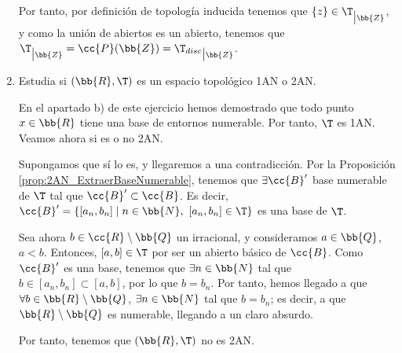 \begin{ejercicio}
\begin{enumerate}[label=\alph*)]
        Por tanto, por definición de topología inducida tenemos que $\{z\}\in \T_{\big | \bb{Z}}$, y como la unión de abiertos es un abierto, tenemos que $\T_{\big | \bb{Z}}=\cc{P}(\bb{Z})={\T_{disc}}_{\big| \bb{Z}}$.

        \item Estudia si $(\bb{R}, \T)$ es un espacio topológico 1AN o 2AN.

        En el apartado b) de este ejercicio hemos demostrado que todo punto $x\in \bb{R}$ tiene una base de entornos numerable. Por tanto, $\T$ es 1AN. Veamos ahora si es o no 2AN.

        Supongamos que sí lo es, y llegaremos a una contradicción. Por la Proposición \ref{prop:2AN_ExtraerBaseNumerable}, tenemos que $\exists \cc{B}'$ base numerable de $\T$ tal que $\cc{B}'\subset \cc{B}$. Es decir, $\cc{B}'=\{[a_n,b_n]\mid n\in \bb{N},~[a_n,b_n]\in \T\}$ es una base de $\T$.

        Sea ahora $b\in \cc{R}\setminus \bb{Q}$ un irracional, y consideramos $a\in \bb{Q}$, $a<b$. Entonces, $[a,b]\in \T$ por ser un abierto básico de $\cc{B}$. Como $\cc{B}'$ es una base, tenemos que $\exists n\in \bb{N}$ tal que $b\in [a_n, b_n]\subset [a,b]$, por lo que $b=b_n$. Por tanto, hemos llegado a que $\forall b\in \bb{R}\setminus \bb{Q}$, $\exists n\in \bb{N}$ tal que $b=b_n$; es decir, a que $\bb{R}\setminus \bb{Q}$ es numerable, llegando a un claro absurdo.

        Por tanto, tenemos que $(\bb{R}, \T)$ no es 2AN.
    \end{enumerate}
\end{ejercicio}